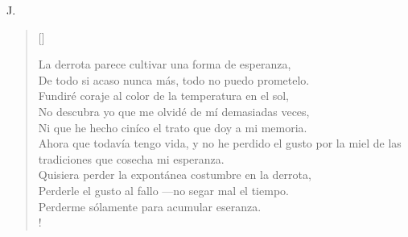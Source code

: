\documentclass[11pt, a4paper]{article} %
\newcommand{\poemauthorright}[1]{\nopagebreak{\raggedleft\footnotesize\textsc{#1}\par}} %
\begin{document}
{ J}.


\poemtitle{}

\settowidth{\versewidth}{If you can meet with Triumph and Disaster} %

\begin{verse}[\versewidth]
{\scriptsize


La derrota parece cultivar una forma de esperanza, \\
De todo si acaso nunca más, todo no puedo prometelo. \\
Fundiré coraje al color de la temperatura en el sol, \\
No descubra yo que me olvidé de mí demasiadas veces, \\
Ni que he hecho ciníco el trato que doy a mi memoria. \\
Ahora que todavía tengo vida, y no he perdido el gusto por la miel de las tradiciones que cosecha mi esperanza. \\
Quisiera perder la expontánea costumbre en la derrota, \\
Perderle el gusto al fallo ---no segar mal el tiempo. \\
Perderme sólamente para acumular eseranza. \\!
}
\end{verse}


\poemauthorright{Santiago} %

\end{document}
